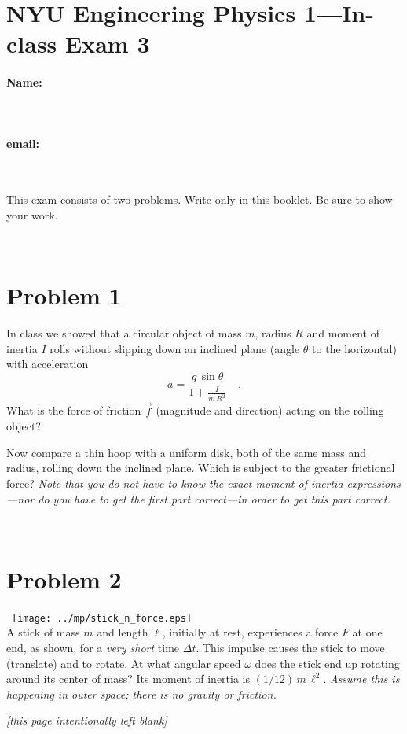 \documentclass[12pt]{article}
\begin{document}
\section*{NYU Engineering Physics 1---In-class Exam 3}

\vfill

\paragraph{Name:} ~

\paragraph{email:} ~

\vfill

This exam consists of two problems.  Write only in this booklet.  Be
sure to show your work.

\vfill ~

\clearpage

\section*{Problem 1}

In class we showed that a circular object of mass $m$, radius $R$ and
moment of inertia $I$ rolls without slipping down an inclined plane
(angle $\theta$ to the horizontal) with acceleration
$$
a=\frac{g\,\sin\theta}{1+\frac{I}{m\,R^2}} \quad .
$$ What is the force of friction $\vec{f}$ (magnitude and direction)
acting on the rolling object?

\vfill

Now compare a thin hoop with a uniform disk, both of the same mass and
radius, rolling down the inclined plane.  Which is subject to the
greater frictional force?  \emph{Note that you do not have to know the
exact moment of inertia expressions---nor do you have to get the first
part correct---in order to get this part correct.}

\vfill ~

\clearpage

\section*{Problem 2}

~\hfill\texttt{[image: ../mp/stick\_n\_force.eps]}\hfill~\\ A stick of
mass $m$ and length $\ell$, initially at rest, experiences a force $F$
at one end, as shown, for a \emph{very short} time $\Delta t$.  This
impulse causes the stick to move (translate) and to rotate.  At what
angular speed $\omega$ does the stick end up rotating around its
center of mass?  Its moment of inertia is $(1/12)\,m\,\ell^2$.
\emph{Assume this is happening in outer space; there is no gravity or
friction.}

\clearpage

\centerline{\textsl{[this page intentionally left blank]}}
\end{document}
